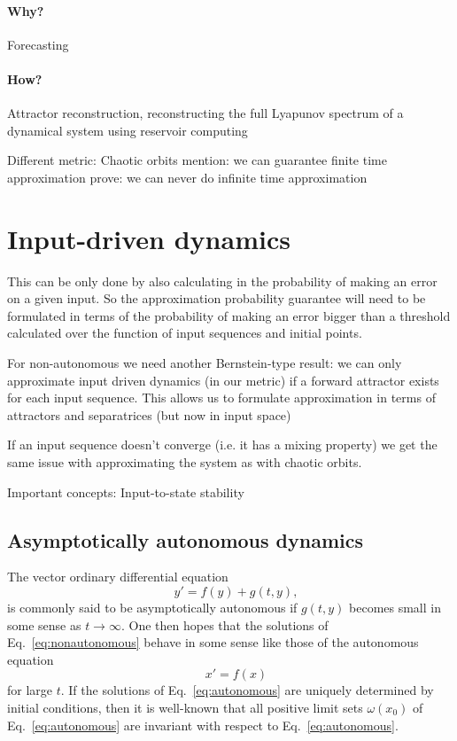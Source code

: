 \documentclass{article}
\theoremstyle{definition}
\theoremstyle{remark}
\newcounter{ct}
\begin{document}
\paragraph{Why?} 
Forecasting
\citep{jaeger2004harnessing}
\citep{fan2020long}
\citep{vlachas2020backpropagation}
\citep{grigoryeva2024forecasting}

\paragraph{How?}
Attractor reconstruction, reconstructing the full Lyapunov spectrum of a dynamical system using reservoir computing \citep{hart2024attractor}

Different metric: Chaotic orbits
mention: we can guarantee finite time approximation
prove: we can never do infinite time approximation 



\section{Input-driven dynamics}

This can be only done by also calculating in the probability of making an error on a given input.
So the approximation probability guarantee will need to be formulated in terms of the probability of making an error bigger than a threshold calculated over the function of input sequences and initial points.

For non-autonomous we need another Bernstein-type result:
we can only approximate input driven dynamics (in our metric) if a forward attractor exists for each input sequence.
This allows us to formulate approximation in terms of attractors and separatrices (but now in input space)

If an input sequence doesn't converge (i.e. it has a mixing property) we get the same issue with approximating the system as with chaotic orbits.


Important concepts: %
Input-to-state stability \citep{sontag1995iss, sontag1996iss, sontag2008iss}

\subsection{Asymptotically autonomous dynamics}

The vector ordinary differential equation  
\begin{equation}\label{eq:nonautonomous}
 \quad y' = f(y) + g(t, y),
\end{equation}
is commonly said to be asymptotically autonomous if \( g(t, y) \) becomes small in some sense as \( t \to \infty \). One then hopes that the solutions of Eq.~\ref{eq:nonautonomous} behave in some sense like those of the autonomous equation  
\begin{equation}\label{eq:autonomous}
\quad x' = f(x)
\end{equation}
for large \( t \). If the solutions of Eq.~\ref{eq:autonomous} are uniquely determined by initial conditions,   then it is well-known \cite{} that all positive limit sets \( \omega(x_0) \) of Eq.~\ref{eq:autonomous} are invariant with respect to Eq.~\ref{eq:autonomous}.
\end{document}
